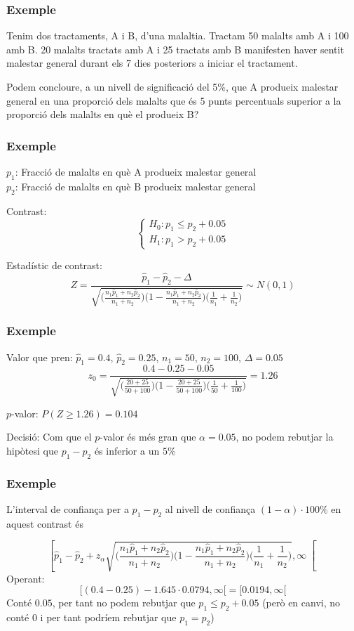 \documentclass[12pt,t]{beamer}
\renewcommand{\emph}[1]{{\color{red}#1}}
\renewcommand{\leq}{\leqslant}
\renewcommand{\geq}{\geqslant}
\theoremstyle{plain}
\theoremstyle{definition}
\begin{document}
\begin{frame}
\frametitle{Exemple}
Tenim dos tractaments, A i B, d'una malaltia. Tractam 50 malalts amb A i 100 amb B. 20 malalts  tractats amb A i 25 tractats amb B manifesten haver sentit malestar general durant els 7 dies posteriors a iniciar el tractament.
\medskip

Podem concloure, a un nivell de significació del 5\%, que A produeix malestar general en una proporció dels malalts que és 5 punts percentuals superior  a la proporció dels malalts en què el produeix B?

\end{frame}


\begin{frame}
\frametitle{Exemple}

$p_1$: Fracció de malalts en què A produeix malestar general\\
$p_2$: Fracció de malalts en què B produeix malestar general
\medskip

\emph{Contrast}:
$$
\left\{\begin{array}{l}
H_0:p_1\leq p_2+0.05\\
H_1:p_1>p_2+0.05
\end{array}\right.
$$

\emph{Estadístic de contrast}:
$$
Z=\frac{\widehat{p}_1 -\widehat{p}_2-\Delta}{
\sqrt{\Big(\frac{n_1 \widehat{p}_1 +n_2 \widehat{p}_2}{n_1
+n_2}\Big)\Big(1-\frac{n_1 \widehat{p}_1 +n_2 \widehat{p}_2}{n_1
+n_2}\Big)\Big(\frac{1}{n_1}+\frac{1}{n_2}
\Big)}}\sim N(0,1)
$$
\bigskip

\end{frame}
\begin{frame}
\frametitle{Exemple}


\emph{Valor que pren}: $\widehat{p}_1=0.4$, $\widehat{p}_2=0.25$, $n_1=50$, $n_2=100$, $\Delta=0.05$
$$
z_0=\frac{0.4 -0.25-0.05}{
\sqrt{\Big(\frac{20+25}{50+100}\Big)\Big(1-\frac{20+25}{50+100}\Big)\Big(\frac{1}{50}+\frac{1}{100}
\Big)}}
=1.26
$$
\medskip

\emph{$p$-valor}: $P(Z\geq 1.26)= 0.104$
\medskip

\emph{Decisió}: Com que el $p$-valor és més gran que $\alpha=0.05$, no podem rebutjar la hipòtesi que $p_1-p_2$ és inferior a un $5\%$

\end{frame}
\begin{frame}
\frametitle{Exemple}

L'\emph{interval de confiança} per a  $p_1-p_2$
al nivell de confiança $(1-\alpha)\cdot 100\%$ en aquest contrast és

{\footnotesize $$
\left[\widehat{p}_1-\widehat{p}_2+z_{\alpha}\sqrt{\Big(\frac{n_1 \widehat{p}_1 +n_2 \widehat{p}_2}{n_1
+n_2}\Big)\Big(1-\frac{n_1 \widehat{p}_1 +n_2 \widehat{p}_2}{n_1
+n_2}\Big)\Big(\frac{1}{n_1}+\frac{1}{n_2}
\Big)},\infty
\right[
$$
}
Operant:
$$
[(0.4-0.25)-1.645\cdot 0.0794,\infty [=[0.0194,\infty[
$$
Conté $0.05$, per tant no podem rebutjar que $p_1\leq p_2+ 0.05$ (però en canvi, no conté 0 i per tant podríem rebutjar que $p_1=p_2$)
\end{frame}
\end{document}
